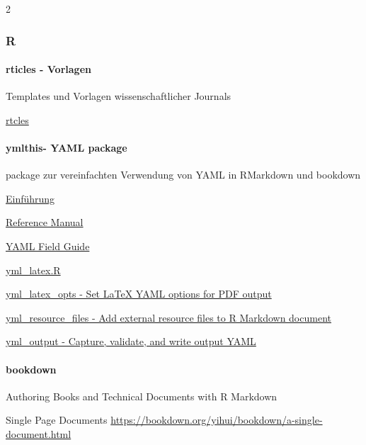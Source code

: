 \documentclass[
  a4paper,
  twoside]{article}
\let\oldparagraph\paragraph
\renewcommand{\paragraph}[1]{\oldparagraph{#1}\mbox{}}
\begin{document}
\begin {multicols}{2}
\hypertarget{r}{%
\subsubsection{R}\label{r}}

\hypertarget{rticles---vorlagen}{%
\paragraph{rticles - Vorlagen}\label{rticles---vorlagen}}

Templates und Vorlagen wissenschaftlicher Journals

\href{https://github.com/rstudio/rticles}{rtcles}

\hypertarget{ymlthis--yaml-package}{%
\paragraph{ymlthis- YAML package}\label{ymlthis--yaml-package}}

package zur vereinfachten Verwendung von YAML in RMarkdown und bookdown

\href{https://cran.r-project.org/web/packages/ymlthis/vignettes/introduction-to-ymlthis.html}{Einführung}

\href{https://cran.r-project.org/web/packages/ymlthis/ymlthis.pdf}{Reference Manual}

\href{https://cran.r-project.org/web/packages/ymlthis/vignettes/yaml-fieldguide.html}{YAML Field Guide}

\href{https://github.com/r-lib/ymlthis/blob/master/R/yml_latex.R}{yml\_latex.R}

\href{https://rdrr.io/github/r-lib/ymlthis/man/yml_latex_opts.html}{yml\_latex\_opts - Set LaTeX YAML options for PDF output}

\href{https://www.rdocumentation.org/packages/ymlthis/versions/0.1.2/topics/yml_resource_files}{yml\_resource\_files - Add external resource files to R Markdown document}

\href{https://github.com/r-lib/ymlthis/blob/master/R/yml_output.R}{yml\_output - Capture, validate, and write output YAML}

\hypertarget{bookdown}{%
\paragraph{bookdown}\label{bookdown}}

Authoring Books and Technical Documents with R Markdown

Single Page Documents \url{https://bookdown.org/yihui/bookdown/a-single-document.html}


\end{multicols}
\end{document}
